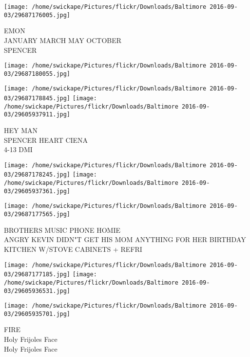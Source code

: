 \documentclass[10pt,letterpaper]{article}
\begin{document}
\texttt{[image: /home/swickape/Pictures/flickr/Downloads/Baltimore 2016-09-03/29687176005.jpg]}

EMON\\
JANUARY MARCH MAY OCTOBER\\
SPENCER
\pagebreak

\texttt{[image: /home/swickape/Pictures/flickr/Downloads/Baltimore 2016-09-03/29687180055.jpg]}

\vspace{0.25in}
\texttt{[image: /home/swickape/Pictures/flickr/Downloads/Baltimore 2016-09-03/29687178845.jpg]}
\texttt{[image: /home/swickape/Pictures/flickr/Downloads/Baltimore 2016-09-03/29605937911.jpg]}

HEY MAN\\
SPENCER HEART CIENA\\
4{-}13 DMI
\pagebreak

\texttt{[image: /home/swickape/Pictures/flickr/Downloads/Baltimore 2016-09-03/29687178245.jpg]}
\texttt{[image: /home/swickape/Pictures/flickr/Downloads/Baltimore 2016-09-03/29605937361.jpg]}

\vspace{0.25in}
\texttt{[image: /home/swickape/Pictures/flickr/Downloads/Baltimore 2016-09-03/29687177565.jpg]}

BROTHERS MUSIC PHONE HOMIE\\
ANGRY KEVIN DIDN"T GET HIS MOM ANYTHING FOR HER BIRTHDAY\\
KITCHEN W/STOVE CABINETS + REFRI
\pagebreak

\texttt{[image: /home/swickape/Pictures/flickr/Downloads/Baltimore 2016-09-03/29687177185.jpg]}
\texttt{[image: /home/swickape/Pictures/flickr/Downloads/Baltimore 2016-09-03/29605936531.jpg]}

\texttt{[image: /home/swickape/Pictures/flickr/Downloads/Baltimore 2016-09-03/29605935701.jpg]}

FIRE\\
Holy Frijoles Face\\
Holy Frijoles Face
\pagebreak
\end{document}
